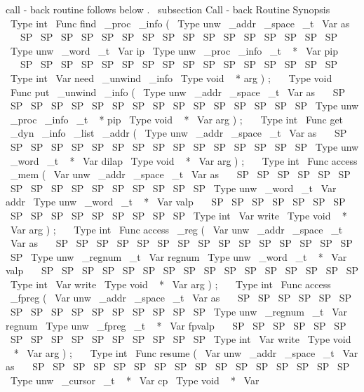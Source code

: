 call
-
back
routine
follows
below
.
\
subsection
{
Call
-
back
Routine
Synopsis
}
\
Type
{
int
}
\
Func
{
find
\
_proc
\
_info
}
(
\
Type
{
unw
\
_addr
\
_space
\
_t
}
\
Var
{
as
}
\
\
\
SP
\
SP
\
SP
\
SP
\
SP
\
SP
\
SP
\
SP
\
SP
\
SP
\
SP
\
SP
\
SP
\
SP
\
SP
\
SP
\
Type
{
unw
\
_word
\
_t
}
\
Var
{
ip
}
\
Type
{
unw
\
_proc
\
_info
\
_t
~
*
}
\
Var
{
pip
}
\
\
\
SP
\
SP
\
SP
\
SP
\
SP
\
SP
\
SP
\
SP
\
SP
\
SP
\
SP
\
SP
\
SP
\
SP
\
SP
\
SP
\
Type
{
int
}
\
Var
{
need
\
_unwind
\
_info
}
\
Type
{
void
~
*
}
arg
)
;
\
\
\
Type
{
void
}
\
Func
{
put
\
_unwind
\
_info
}
(
\
Type
{
unw
\
_addr
\
_space
\
_t
}
\
Var
{
as
}
\
\
\
SP
\
SP
\
SP
\
SP
\
SP
\
SP
\
SP
\
SP
\
SP
\
SP
\
SP
\
SP
\
SP
\
SP
\
SP
\
SP
\
Type
{
unw
\
_proc
\
_info
\
_t
~
*
}
pip
\
Type
{
void
~
*
}
\
Var
{
arg
}
)
;
\
\
\
Type
{
int
}
\
Func
{
get
\
_dyn
\
_info
\
_list
\
_addr
}
(
\
Type
{
unw
\
_addr
\
_space
\
_t
}
\
Var
{
as
}
\
\
\
SP
\
SP
\
SP
\
SP
\
SP
\
SP
\
SP
\
SP
\
SP
\
SP
\
SP
\
SP
\
SP
\
SP
\
SP
\
SP
\
Type
{
unw
\
_word
\
_t
~
*
}
\
Var
{
dilap
}
\
Type
{
void
~
*
}
\
Var
{
arg
}
)
;
\
\
\
Type
{
int
}
\
Func
{
access
\
_mem
}
(
\
Var
{
unw
\
_addr
\
_space
\
_t
}
\
Var
{
as
}
\
\
\
SP
\
SP
\
SP
\
SP
\
SP
\
SP
\
SP
\
SP
\
SP
\
SP
\
SP
\
SP
\
SP
\
SP
\
SP
\
SP
\
Type
{
unw
\
_word
\
_t
}
\
Var
{
addr
}
\
Type
{
unw
\
_word
\
_t
~
*
}
\
Var
{
valp
}
\
\
\
SP
\
SP
\
SP
\
SP
\
SP
\
SP
\
SP
\
SP
\
SP
\
SP
\
SP
\
SP
\
SP
\
SP
\
SP
\
SP
\
Type
{
int
}
\
Var
{
write
}
\
Type
{
void
~
*
}
\
Var
{
arg
}
)
;
\
\
\
Type
{
int
}
\
Func
{
access
\
_reg
}
(
\
Var
{
unw
\
_addr
\
_space
\
_t
}
\
Var
{
as
}
\
\
\
SP
\
SP
\
SP
\
SP
\
SP
\
SP
\
SP
\
SP
\
SP
\
SP
\
SP
\
SP
\
SP
\
SP
\
SP
\
SP
\
Type
{
unw
\
_regnum
\
_t
}
\
Var
{
regnum
}
\
Type
{
unw
\
_word
\
_t
~
*
}
\
Var
{
valp
}
\
\
\
SP
\
SP
\
SP
\
SP
\
SP
\
SP
\
SP
\
SP
\
SP
\
SP
\
SP
\
SP
\
SP
\
SP
\
SP
\
SP
\
Type
{
int
}
\
Var
{
write
}
\
Type
{
void
~
*
}
\
Var
{
arg
}
)
;
\
\
\
Type
{
int
}
\
Func
{
access
\
_fpreg
}
(
\
Var
{
unw
\
_addr
\
_space
\
_t
}
\
Var
{
as
}
\
\
\
SP
\
SP
\
SP
\
SP
\
SP
\
SP
\
SP
\
SP
\
SP
\
SP
\
SP
\
SP
\
SP
\
SP
\
SP
\
SP
\
Type
{
unw
\
_regnum
\
_t
}
\
Var
{
regnum
}
\
Type
{
unw
\
_fpreg
\
_t
~
*
}
\
Var
{
fpvalp
}
\
\
\
SP
\
SP
\
SP
\
SP
\
SP
\
SP
\
SP
\
SP
\
SP
\
SP
\
SP
\
SP
\
SP
\
SP
\
SP
\
SP
\
Type
{
int
}
\
Var
{
write
}
\
Type
{
void
~
*
}
\
Var
{
arg
}
)
;
\
\
\
Type
{
int
}
\
Func
{
resume
}
(
\
Var
{
unw
\
_addr
\
_space
\
_t
}
\
Var
{
as
}
\
\
\
SP
\
SP
\
SP
\
SP
\
SP
\
SP
\
SP
\
SP
\
SP
\
SP
\
SP
\
SP
\
SP
\
SP
\
SP
\
SP
\
Type
{
unw
\
_cursor
\
_t
~
*
}
\
Var
{
cp
}
\
Type
{
void
~
*
}
\
Var

